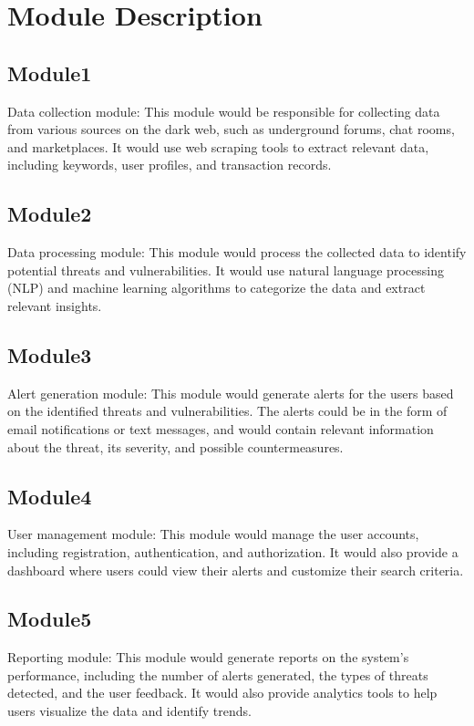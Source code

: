 \documentclass[10pt]{report}
\begin{document}
\section{Module Description}
\subsection{Module1}
Data collection module:
This module would be responsible for collecting data from various sources on the dark web, such as underground forums, chat rooms, and marketplaces. It would use web scraping tools to extract relevant data, including keywords, user profiles, and transaction records.
\subsection{Module2}
Data processing module: 
This module would process the collected data to identify potential threats and vulnerabilities. It would use natural language processing (NLP) and machine learning algorithms to categorize the data and extract relevant insights.

\subsection{Module3}
Alert generation module: 
This module would generate alerts for the users based on the identified threats and vulnerabilities. The alerts could be in the form of email notifications or text messages, and would contain relevant information about the threat, its severity, and possible countermeasures.

\subsection{Module4}
User management module: 
This module would manage the user accounts, including registration, authentication, and authorization. It would also provide a dashboard where users could view their alerts and customize their search criteria.

\subsection{Module5}
Reporting module: 
This module would generate reports on the system's performance, including the number of alerts generated, the types of threats detected, and the user feedback. It would also provide analytics tools to help users visualize the data and identify trends.
\end{document}
